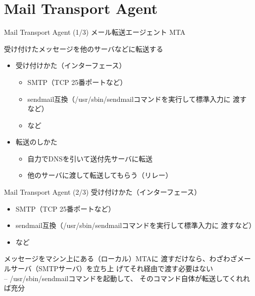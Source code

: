 \section{Mail Transport Agent}
\begin{frame}{Mail Transport Agent (1/3)}
 メール転送エージェント MTA

 受け付けたメッセージを他のサーバなどに転送する
 \pause
 \begin{itemize}
  \item 受け付けかた（インターフェース）
	\begin{itemize}
	 \item SMTP（TCP 25番ポートなど）
	 \item sendmail互換（/usr/sbin/sendmailコマンドを実行して標準入力に
	       渡すなど）
	 \item など
	\end{itemize}
 \pause
  \item 転送のしかた
	\begin{itemize}
	 \item 自力でDNSを引いて送付先サーバに転送
	 \item 他のサーバに渡して転送してもらう（リレー）
	\end{itemize}
 \end{itemize}
 
\end{frame}

\begin{frame}{Mail Transport Agent (2/3)}
 受け付けかた（インターフェース）
	\begin{itemize}
	 \item SMTP（TCP 25番ポートなど）
	 \item sendmail互換（/usr/sbin/sendmailコマンドを実行して標準入力に
	       渡すなど）
	 \item など
	\end{itemize}

 メッセージをマシン上にある（ローカル）MTAに
	       渡すだけなら、わざわざメールサーバ（SMTPサーバ）を立ち上
 げてそれ経由で渡す必要はない\\
 -- /usr/sbin/sendmailコマンドを起動して、
 そのコマンド自体が転送してくれれば充分
\end{frame}


